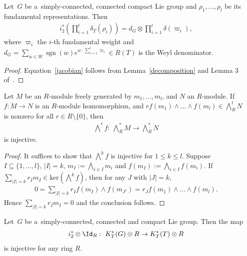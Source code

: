 \begin{Lemma}
\label{Atiyahindex}
Let~$G$ be a~simply-connected, connected compact Lie group and $\rho_1, \dots, \rho_l$ be its fundamental
representations.
Then
\begin{gather}
\label{jacobian}
i_2^*\left(\prod\limits_{i=1}^l\delta_T(\rho_i)\right)=d_G\otimes\prod\limits_{i=1}^l\delta(\varpi_i),
\end{gather}
where $\varpi_i$ the $i$-th fundamental weight and $d_G=
\sum\limits_{w\in W}
\operatorname{sgn}(w)e^{w\cdot
\sum\limits_{i=1}^l\varpi_i}\in R(T)$ is the Weyl deno\-mi\-nator.
\end{Lemma}
\begin{proof}
Equation~\eqref{jacobian} follows from Lemma~\ref{decomposition} and Lemma 3 of~\cite{At2}.
\end{proof}
\begin{Lemma}
\label{wedgeinj}
Let $M$ be an $R$-module freely generated by $m_1, \dots, m_l$, and $N$ an $R$-module.
If $f: M\to N$ is an $R$-module homomorphism, and $rf(m_1)\wedge\dots\wedge f(m_l)\in \bigwedge_R^l N$ is nonzero for
all $r\in R
\setminus\{0\}$, then
\begin{gather*}
\bigwedge\nolimits^* f: \ \bigwedge\nolimits_R^*M\to \bigwedge\nolimits_R^*N
\end{gather*}
is injective.
\end{Lemma}
\begin{proof}
It suf\/f\/ices to show that $\bigwedge^k f$ is injective for $1\leq k\leq l$.
Suppose $I
\subseteq\{1, \dots, l\}$, $|I|=k$, $m_I:=\bigwedge_{i\in I}m_i$ and $f(m_I):=\bigwedge_{i\in I}f(m_i)$.
If $\sum\limits_{|I|=k}
r_Im_I\in\text{ker}(\bigwedge^k f)$, then for any $J$ with $|J|=k$,
\begin{gather*}
0=
\sum\limits_{|I|=k}
r_If(m_I)\wedge f(m_{J^c})=r_Jf(m_1)\wedge\dots\wedge f(m_l).
\end{gather*}
Hence $\sum\limits_{|I|=k}
r_Im_I=0$ and the conclusion follows.
\end{proof}
\begin{Lemma}
\label{twotorsioninj}
Let~$G$ be a~simply-connected, connected and compact Lie group.
Then the map
\begin{gather*}
i_2^*\otimes\Id_R: \ K_T^*(G)\otimes R\to K_T^*(T)\otimes R
\end{gather*}
is injective for any ring $R$.
\end{Lemma}
